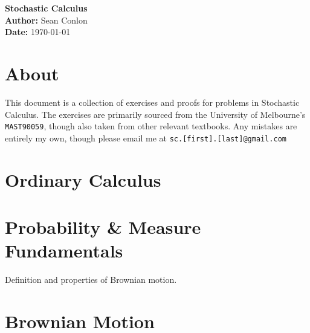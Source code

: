 \documentclass{article}
\begin{document}
\begin{titlepage}
    \centering
    {\Huge \textbf{Stochastic Calculus}}\\[1.5cm] %
    \textbf{Author:} Sean Conlon\\[1cm] %
    \textbf{Date:} \today\\[3cm] %
    
    \section*{About}
    This document is a collection of exercises and proofs for problems in Stochastic Calculus. The exercises are primarily sourced from the University of Melbourne's \texttt{MAST90059}, though also taken from other relevant textbooks. Any mistakes are entirely my own, though please email me at \texttt{sc.[first].[last]@gmail.com}\\[2cm]

    \tableofcontents
    
\end{titlepage}

\newpage
\section{Ordinary Calculus}

\newpage
\section{Probability \& Measure Fundamentals}
Definition and properties of Brownian motion.

\newpage
\section{Brownian Motion}
\end{document}
